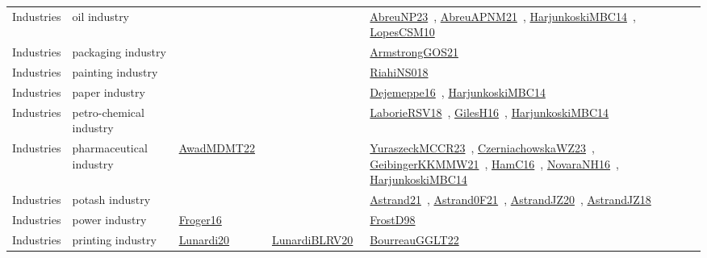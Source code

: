 {\begin{longtable}{lp{3cm}>{\raggedright\arraybackslash}p{6cm}>{\raggedright\arraybackslash}p{6cm}>{\raggedright\arraybackslash}p{8cm}}
Industries & oil industry &  &  & \href{../works/AbreuNP23.pdf}{AbreuNP23}~\cite{AbreuNP23}, \href{../works/AbreuAPNM21.pdf}{AbreuAPNM21}~\cite{AbreuAPNM21}, \href{../works/HarjunkoskiMBC14.pdf}{HarjunkoskiMBC14}~\cite{HarjunkoskiMBC14}, \href{../works/LopesCSM10.pdf}{LopesCSM10}~\cite{LopesCSM10}\\
Industries & packaging industry &  &  & \href{../works/ArmstrongGOS21.pdf}{ArmstrongGOS21}~\cite{ArmstrongGOS21}\\
Industries & painting industry &  &  & \href{../works/RiahiNS018.pdf}{RiahiNS018}~\cite{RiahiNS018}\\
Industries & paper industry &  &  & \href{../works/Dejemeppe16.pdf}{Dejemeppe16}~\cite{Dejemeppe16}, \href{../works/HarjunkoskiMBC14.pdf}{HarjunkoskiMBC14}~\cite{HarjunkoskiMBC14}\\
Industries & petro-chemical industry &  &  & \href{../works/LaborieRSV18.pdf}{LaborieRSV18}~\cite{LaborieRSV18}, \href{../works/GilesH16.pdf}{GilesH16}~\cite{GilesH16}, \href{../works/HarjunkoskiMBC14.pdf}{HarjunkoskiMBC14}~\cite{HarjunkoskiMBC14}\\
Industries & pharmaceutical industry & \href{../works/AwadMDMT22.pdf}{AwadMDMT22}~\cite{AwadMDMT22} &  & \href{../works/YuraszeckMCCR23.pdf}{YuraszeckMCCR23}~\cite{YuraszeckMCCR23}, \href{../works/CzerniachowskaWZ23.pdf}{CzerniachowskaWZ23}~\cite{CzerniachowskaWZ23}, \href{../works/GeibingerKKMMW21.pdf}{GeibingerKKMMW21}~\cite{GeibingerKKMMW21}, \href{../works/HamC16.pdf}{HamC16}~\cite{HamC16}, \href{../works/NovaraNH16.pdf}{NovaraNH16}~\cite{NovaraNH16}, \href{../works/HarjunkoskiMBC14.pdf}{HarjunkoskiMBC14}~\cite{HarjunkoskiMBC14}\\
Industries & potash industry &  &  & \href{../works/Astrand21.pdf}{Astrand21}~\cite{Astrand21}, \href{../works/Astrand0F21.pdf}{Astrand0F21}~\cite{Astrand0F21}, \href{../works/AstrandJZ20.pdf}{AstrandJZ20}~\cite{AstrandJZ20}, \href{../works/AstrandJZ18.pdf}{AstrandJZ18}~\cite{AstrandJZ18}\\
Industries & power industry & \href{../works/Froger16.pdf}{Froger16}~\cite{Froger16} &  & \href{../works/FrostD98.pdf}{FrostD98}~\cite{FrostD98}\\
Industries & printing industry & \href{../works/Lunardi20.pdf}{Lunardi20}~\cite{Lunardi20} & \href{../works/LunardiBLRV20.pdf}{LunardiBLRV20}~\cite{LunardiBLRV20} & \href{../works/BourreauGGLT22.pdf}{BourreauGGLT22}~\cite{BourreauGGLT22}\\

\end{longtable}}
